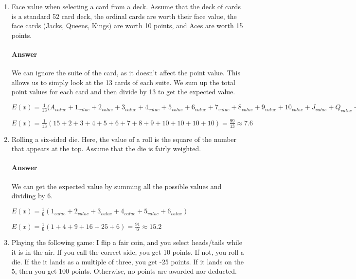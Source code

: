 \documentclass{article}
\begin{document}
\begin{enumerate}
    \item Face value when selecting a card from a deck.  Assume that the deck of
        cards is a standard 52 card deck, the ordinal cards are worth their face
        value, the face cards (Jacks, Queens, Kings) are
        worth 10 points, and Aces are worth 15 points.
        
        \paragraph{Answer} We can ignore the suite of the card, as it doesn't affect the point value. This allows us to simply look at the 13 cards of each suite. We sum up the total point values for each card and then divide by 13 to get the expected value.
        
        $E(x) = \frac{1}{13}(A_{value} + 1_{value} + 2_{value} + 3_{value} + 4_{value} + 5_{value} + 6_{value} + 7_{value} + 8_{value} + 9_{value} + 10_{value} + J_{value} + Q_{value} + K_{value}$
        
        $E(x) = \frac{1}{13}(15 + 2 + 3 + 4 + 5 + 6 + 7 + 8 + 9 + 10 + 10 + 10 + 10) = \frac{99}{13} \approx 7.6$
        
    \item Rolling a six-sided die.  Here, the value of a roll is the square of
        the number that appears at the top.  Assume that the die is fairly
        weighted.
        
        \paragraph{Answer} We can get the expected value by summing all the possible values and dividing by 6.
        
        $E(x) = \frac{1}{6}(1_{value} + 2_{value} + 3_{value} + 4_{value} + 5_{value} + 6_{value})$
        
        $E(x) = \frac{1}{6}(1 + 4 + 9 + 16 + 25 + 6) = \frac{91}{6} \approx 15.2$
        
    \item Playing the following game: I flip a fair coin, and you select
        heads/tails while it is in the air.  If you call the correct side,
        you get 10 points.  If not, you roll a die.  If the it lands as a
        multiple of three, you get -25 points.
        If it lands on the 5, then you get 100 points.  Otherwise, no points are
        awarded nor deducted.
        

\end{enumerate}
\end{document}
